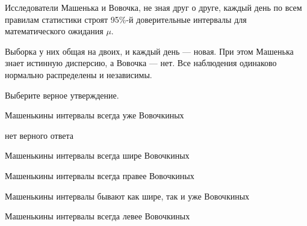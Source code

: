 
\begin{question}
Исследователи Машенька и Вовочка, не зная друг о друге, каждый день по
всем правилам статистики строят 95\%-й доверительные интервалы для
математического ожидания \(\mu\).

Выборка у них общая на двоих, и каждый день --- новая. При этом Машенька
знает истинную дисперсию, а Вовочка --- нет. Все наблюдения одинаково
нормально распределены и независимы.

Выберите верное утверждение.
\begin{answerlist}
  \item Машенькины интервалы всегда уже Вовочкиных
  \item нет верного ответа
  \item Машенькины интервалы всегда шире Вовочкиных
  \item Машенькины интервалы всегда правее Вовочкиных
  \item Машенькины интервалы бывают как шире, так и уже Вовочкиных
  \item Машенькины интервалы всегда левее Вовочкиных
\end{answerlist}
\end{question}


